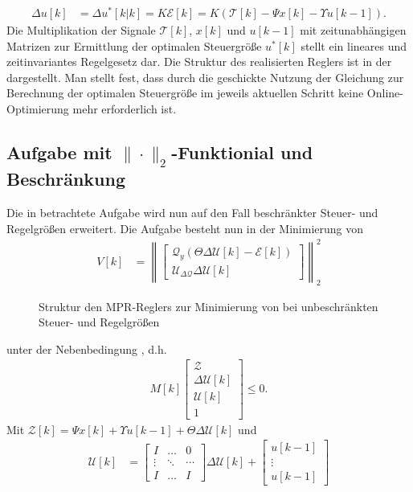 \begin{remark}
\begin{align*}
	\Delta u[k] & = \Delta u^{\ast}[k|k] = K\mathcal{E}[k]=K\left(\mathcal{T}[k]-\Psi x[k]-\Upsilon u[k-1]\right).
\end{align*}
Die Multiplikation der Signale $\mathcal{T}[k]$, $x[k]$ und $u[k-1]$ mit zeitunabhängigen Matrizen zur Ermittlung der optimalen Steuergröße $u^{\ast}[k]$ stellt ein lineares und
zeitinvariantes Regelgesetz dar. Die Struktur des realisierten Reglers ist in der  dargestellt. Man stellt fest, dass durch die geschickte
Nutzung der Gleichung  zur Berechnung der optimalen Steuergröße im jeweils aktuellen Schritt keine Online-Optimierung mehr erforderlich ist.
\end{remark}

\subsection{Aufgabe mit $\|\cdot\|_2$-Funktionial und Beschränkung}
\label{subsec:aufgabe_quad_mit_beschr}
Die in  betrachtete Aufgabe wird nun auf den Fall beschränkter Steuer- und Regelgrößen erweitert. Die Aufgabe besteht nun in der
Minimierung von 
\begin{align}
V[k] & = \left\| \begin{bmatrix}
	\mathcal{Q}_y \left(\Theta\Delta\mathcal{U}[k]-\mathcal{E}[k] \right)\\
	\mathcal{U}_{\Delta\mathcal{Q}}\Delta\mathcal{U}[k]
\end{bmatrix} \right\|_2^2
\end{align}
\begin{figure}[htb]
	\centering
	
	\caption{Struktur den \ac{MPR}-Reglers zur Minimierung von  bei unbeschränkten Steuer- und Regelgrößen}
	\label{fig:kap_4_grundprinzip_mpr}
\end{figure}
unter der Nebenbedingung , d.h.
\begin{align}
	M[k]\begin{bmatrix}
	\mathcal{Z}\\ \Delta\mathcal{U}[k]\\ \mathcal{U}[k]\\ 1
	\end{bmatrix}\le 0. \label{eqn:kap_4_nebenbedinungen_beschr}
\end{align}
Mit $\mathcal{Z}[k]=\Psi x[k]+\Upsilon u[k-1]+\Theta\Delta\mathcal{U}[k]$ und
\begin{align*}
\mathcal{U}[k] & = \begin{bmatrix}
I & \ldots & 0\\
\vdots & \ddots & \cdots\\
I & \ldots & I
\end{bmatrix}\Delta\mathcal{U}[k]+\begin{bmatrix}
u[k-1]\\ \vdots\\ u[k-1]
\end{bmatrix}
\end{align*}
